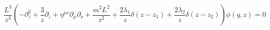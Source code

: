 \begin{equation}
\frac {L^3} {z^3}(-\partial^2_z + \frac 3 z \partial_z + \eta^{\mu
\nu}\partial_\mu
\partial_\nu+ \frac {m^2L^2} {z^2}+ \frac {2\lambda_1} {z} \delta(z-z_1)+
\frac {2\lambda_2}
{z}
\delta(z-z_2))\phi(q,z)=0
\end{equation}

